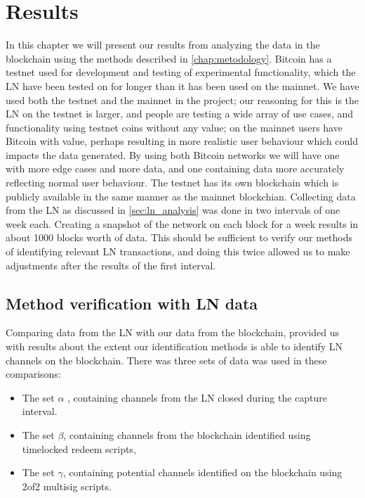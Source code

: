 \chapter{Results}
\label{chap:results}

In this chapter we will present our results from analyzing the data in the blockchain using the methods described in \cref{chap:metodology}. 
Bitcoin has a testnet used for development and testing of experimental functionality, which the LN have been tested on for longer than it has been used on the mainnet. We have used both the testnet and the mainnet in the project; our reasoning for this is the LN on the testnet is larger, and people are testing a wide array of use cases, and functionality using testnet coins without any value; on the mainnet users have Bitcoin with value, perhaps resulting in more realistic user behaviour which could impacts the data generated.
By using both Bitcoin networks we will have one with more edge cases and more data, and one containing data more accurately reflecting normal user behaviour.
The testnet has its own blockchain which is publicly available in the same manner as the mainnet blockchian. Collecting data from the LN as discussed in \cref{sec:ln_analysis} was done in two intervals of one week each. Creating a snapshot of the network on each block for a week results in about 1000 blocks worth of data. This should be sufficient to verify our methods of identifying relevant LN transactions, and doing this twice allowed us to make adjustments after the results of the first interval. 

\section{Method verification with LN data}

Comparing data from the LN with our data from the blockchain, provided us with results about the extent our identification methods is able to identify LN channels on the blockchain. There was three sets of data was used in these comparisons: 
\begin{itemize}
    \item The set \( \alpha \) , containing channels from the LN closed during the capture interval. 
    \item The set \( \beta \), containing channels from the blockchain identified using timelocked redeem scripts,
    \item The set  \( \gamma \), containing potential channels identified on the blockchain using 2of2 multisig scripts.
\end{itemize}

